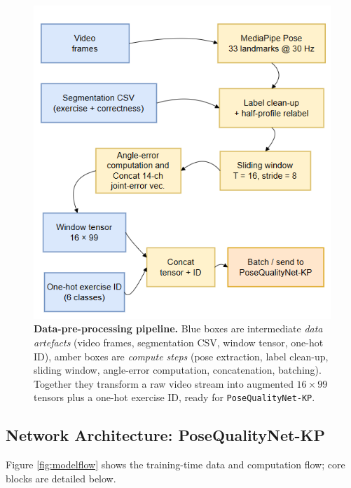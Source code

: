 \documentclass{article}
\begin{document}
\begin{figure}[t] 
  \centering
  \includegraphics[width=\linewidth]{figs/dataflow_pipeline}  %
   \caption{\textbf{Data-pre-processing pipeline.}
           Blue boxes are intermediate \emph{data artefacts}
           (video frames, segmentation CSV, window tensor, one-hot ID),
           amber boxes are \emph{compute steps}
           (pose extraction, label clean-up, sliding window, angle-error
           computation, concatenation, batching).
           Together they transform a raw video stream into augmented
           $16{\times}99$ tensors plus a one-hot exercise ID, ready for
           \texttt{PoseQualityNet-KP}.}
  \label{fig:dataflow}
\end{figure}

\subsection{Network Architecture: PoseQualityNet-KP}
\label{ssec:arch}
Figure \ref{fig:modelflow} shows the training-time data and computation
flow; core blocks are detailed below.
\end{document}
